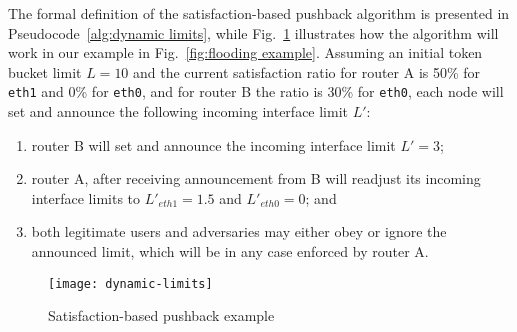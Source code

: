 The formal definition of the satisfaction-based pushback algorithm is presented in Pseudocode~\ref{alg:dynamic limits}, while Fig.~\ref{fig:dynamic limits example} illustrates how the algorithm will work in our example in Fig.~\ref{fig:flooding example}.
Assuming an initial token bucket limit $L=10$ and the current satisfaction ratio for router A is 50\% for \texttt{eth1} and 0\% for \texttt{eth0}, and for router B the ratio is 30\% for \texttt{eth0}, each node will set and announce the following  incoming interface limit $L'$: 
\begin{enumerate}
\item router B will set and announce the incoming interface limit $L'=3$;
\item router A, after receiving announcement from B will readjust its incoming interface limits to $L'_{eth1} = 1.5$ and $L'_{eth0} = 0$; and
\item both legitimate users and adversaries may either obey or ignore the announced limit, which will be in any case enforced by router A.
\end{enumerate}


\begin{figure}[htbp]
  \centering
  \texttt{[image: dynamic-limits]}
  \vspace{-0.3cm}
  \caption{Satisfaction-based pushback example
}
  \label{fig:dynamic limits example}
\end{figure}




